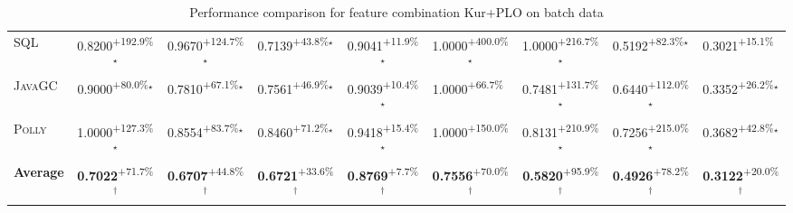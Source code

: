 \begin{table}[htbp]
\begin{tabular}{l|cccc|cccc}
\textsc{SQL} & \cellcolor{green!30}0.8200\textsuperscript{+192.9\%}$^\star$ & \cellcolor{green!30}0.9670\textsuperscript{+124.7\%}$^\star$ & \cellcolor{green!30}0.7139\textsuperscript{+43.8\%}$^\star$ & \cellcolor{green!30}0.9041\textsuperscript{+11.9\%}$^\star$ & \cellcolor{green!30}1.0000\textsuperscript{+400.0\%}$^\star$ & \cellcolor{green!30}1.0000\textsuperscript{+216.7\%}$^\star$ & \cellcolor{green!30}0.5192\textsuperscript{+82.3\%}$^\star$ & \cellcolor{green!30}0.3021\textsuperscript{+15.1\%}$^{\,\,\,}$ \\
\textsc{JavaGC} & \cellcolor{green!30}0.9000\textsuperscript{+80.0\%}$^\star$ & \cellcolor{green!30}0.7810\textsuperscript{+67.1\%}$^\star$ & \cellcolor{green!30}0.7561\textsuperscript{+46.9\%}$^\star$ & \cellcolor{green!30}0.9039\textsuperscript{+10.4\%}$^\star$ & \cellcolor{green!30}1.0000\textsuperscript{+66.7\%}$^{\,\,\,}$ & \cellcolor{green!30}0.7481\textsuperscript{+131.7\%}$^\star$ & \cellcolor{green!30}0.6440\textsuperscript{+112.0\%}$^\star$ & \cellcolor{green!30}0.3352\textsuperscript{+26.2\%}$^\star$ \\
\textsc{Polly} & \cellcolor{green!30}1.0000\textsuperscript{+127.3\%}$^\star$ & \cellcolor{green!30}0.8554\textsuperscript{+83.7\%}$^\star$ & \cellcolor{green!30}0.8460\textsuperscript{+71.2\%}$^\star$ & \cellcolor{green!30}0.9418\textsuperscript{+15.4\%}$^\star$ & \cellcolor{green!30}1.0000\textsuperscript{+150.0\%}$^{\,\,\,}$ & \cellcolor{green!30}0.8131\textsuperscript{+210.9\%}$^\star$ & \cellcolor{green!30}0.7256\textsuperscript{+215.0\%}$^\star$ & \cellcolor{green!30}0.3682\textsuperscript{+42.8\%}$^\star$ \\
\hline
\textbf{Average} & \cellcolor{green!30}\textbf{0.7022}\textsuperscript{+71.7\%}$^\dagger$ & \cellcolor{green!30}\textbf{0.6707}\textsuperscript{+44.8\%}$^\dagger$ & \cellcolor{green!30}\textbf{0.6721}\textsuperscript{+33.6\%}$^\dagger$ & \cellcolor{green!30}\textbf{0.8769}\textsuperscript{+7.7\%}$^\dagger$ & \cellcolor{green!30}\textbf{0.7556}\textsuperscript{+70.0\%}$^\dagger$ & \cellcolor{green!30}\textbf{0.5820}\textsuperscript{+95.9\%}$^\dagger$ & \cellcolor{green!30}\textbf{0.4926}\textsuperscript{+78.2\%}$^\dagger$ & \cellcolor{green!30}\textbf{0.3122}\textsuperscript{+20.0\%}$^\dagger$ \\
\hline
\end{tabular}
\caption{Performance comparison for feature combination Kur+PLO on batch data}
\label{tab:combo_Kur_PLO_performance_batch}
\end{table}